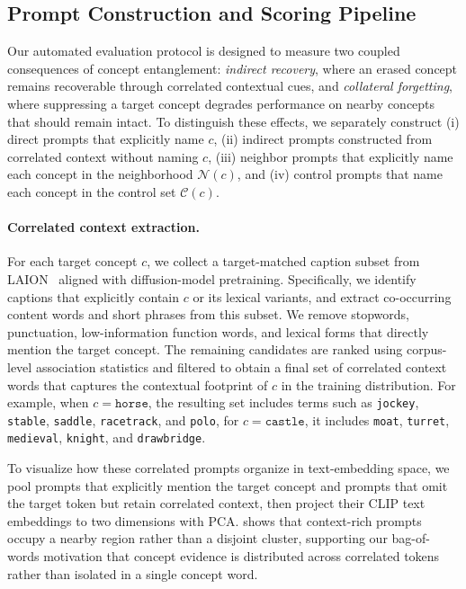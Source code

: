 \subsection{Prompt Construction and Scoring Pipeline}
\label{app:eval_pipeline}
Our automated evaluation protocol is designed to measure two coupled consequences of concept entanglement: \emph{indirect recovery}, where an erased concept remains recoverable through correlated contextual cues, and \emph{collateral forgetting}, where suppressing a target concept degrades performance on nearby concepts that should remain intact. To distinguish these effects, we separately construct (i) direct prompts that explicitly name $c$, (ii) indirect prompts constructed from correlated context without naming $c$, (iii) neighbor prompts that explicitly name each concept in the neighborhood $\mathcal{N}(c)$, and (iv) control prompts that name each concept in the control set $\mathcal{C}(c)$.

\paragraph{Correlated context extraction.}
For each target concept $c$, we collect a target-matched caption subset from LAION~\citep{schuhmann2022laion} aligned with diffusion-model pretraining. Specifically, we identify captions that explicitly contain $c$ or its lexical variants, and extract co-occurring content words and short phrases from this subset. We remove stopwords, punctuation, low-information function words, and lexical forms that directly mention the target concept. The remaining candidates are ranked using corpus-level association statistics and filtered to obtain a final set of correlated context words that captures the contextual footprint of $c$ in the training distribution. For example, when $c=\texttt{horse}$, the resulting set includes terms such as \texttt{jockey}, \texttt{stable}, \texttt{saddle}, \texttt{racetrack}, and \texttt{polo}, for $c = \texttt{castle}$, it includes \texttt{moat}, \texttt{turret}, \texttt{medieval}, \texttt{knight}, and \texttt{drawbridge}.

To visualize how these correlated prompts organize in text-embedding space, we pool prompts that explicitly mention the target concept and prompts that omit the target token but retain correlated context, then project their CLIP text embeddings to two dimensions with PCA.  shows that context-rich prompts occupy a nearby region rather than a disjoint cluster, supporting our bag-of-words motivation that concept evidence is distributed across correlated tokens rather than isolated in a single concept word.

